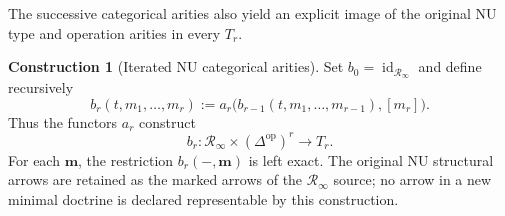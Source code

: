 \documentclass[oneside]{article}
\theoremstyle{plain}
\theoremstyle{definition}
\newtheorem{construction}[theorem]{Construction}
\theoremstyle{remark}
\newcommand{\RNU}{\mathcal R_{\infty}}
\newcommand{\id}{\operatorname{id}}
\newcommand{\op}{\mathrm{op}}
\begin{document}
The successive categorical arities also yield an explicit image of the
original NU type and operation arities in every $T_r$.

\begin{construction}[Iterated NU categorical arities]
\label{con:stratified-NU-arities}
Set $b_0=\id_{\RNU}$ and define recursively
\begin{equation}\label{eq:stratified-native-arities}
 b_r(t,m_1,\ldots,m_r)
 :=a_r\bigl(b_{r-1}(t,m_1,\ldots,m_{r-1}),[m_r]\bigr).
\end{equation}
Thus the functors $a_r$ construct
\[
 b_r:\RNU\times(\Delta^{\op})^r\longrightarrow T_r.
\]
For each $\mathbf m$, the restriction $b_r(-,\mathbf m)$ is left
exact.  The original NU structural arrows are retained as the marked
arrows of the $\RNU$ source; no arrow in a new minimal doctrine is
declared representable by this construction.
\end{construction}
\end{document}
